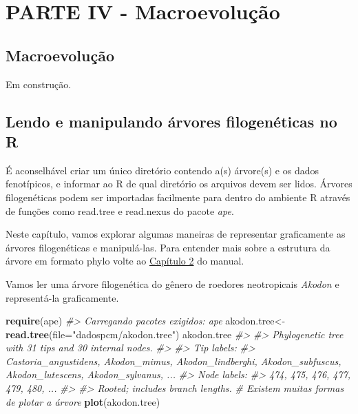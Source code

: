 \documentclass[
]{book}
\newenvironment{Shaded}{\begin{snugshade}}{\end{snugshade}}
\newcommand{\AttributeTok}[1]{\textcolor[rgb]{0.13,0.29,0.53}{#1}}
\newcommand{\CommentTok}[1]{\textcolor[rgb]{0.56,0.35,0.01}{\textit{#1}}}
\newcommand{\FunctionTok}[1]{\textcolor[rgb]{0.13,0.29,0.53}{\textbf{#1}}}
\newcommand{\NormalTok}[1]{#1}
\newcommand{\OtherTok}[1]{\textcolor[rgb]{0.56,0.35,0.01}{#1}}
\newcommand{\StringTok}[1]{\textcolor[rgb]{0.31,0.60,0.02}{#1}}
\begin{document}
\part{PARTE IV - Macroevolução}\label{part-parte-iv---macroevoluuxe7uxe3o}

\chapter{Macroevolução}\label{macroevoluuxe7uxe3o}

Em construção.

\chapter{Lendo e manipulando árvores filogenéticas no R}\label{lendo-e-manipulando-uxe1rvores-filogenuxe9ticas-no-r}

É aconselhável criar um único diretório contendo a(s) árvore(s) e os dados fenotípicos, e informar ao R de qual diretório os arquivos devem ser lidos. Árvores filogenéticas podem ser importadas facilmente para dentro do ambiente R através de funções como read.tree e read.nexus do pacote \emph{ape}.

Neste capítulo, vamos explorar algumas maneiras de representar graficamente as árvores filogenéticas e manipulá-las. Para entender mais sobre a estrutura da árvore em formato phylo volte ao \hyperref[cap2]{Capítulo 2} do manual.

Vamos ler uma árvore filogenética do gênero de roedores neotropicais \emph{Akodon} e representá-la graficamente.

\begin{Shaded}
\begin{Highlighting}[]
\FunctionTok{require}\NormalTok{(ape)}
\CommentTok{\#\textgreater{} Carregando pacotes exigidos: ape}
\NormalTok{akodon.tree}\OtherTok{\textless{}{-}}\FunctionTok{read.tree}\NormalTok{(}\AttributeTok{file=}\StringTok{"dadospcm/akodon.tree"}\NormalTok{)}
\NormalTok{akodon.tree}
\CommentTok{\#\textgreater{} }
\CommentTok{\#\textgreater{} Phylogenetic tree with 31 tips and 30 internal nodes.}
\CommentTok{\#\textgreater{} }
\CommentTok{\#\textgreater{} Tip labels:}
\CommentTok{\#\textgreater{}   Castoria\_angustidens, Akodon\_mimus, Akodon\_lindberghi, Akodon\_subfuscus, Akodon\_lutescens, Akodon\_sylvanus, ...}
\CommentTok{\#\textgreater{} Node labels:}
\CommentTok{\#\textgreater{}   474, 475, 476, 477, 479, 480, ...}
\CommentTok{\#\textgreater{} }
\CommentTok{\#\textgreater{} Rooted; includes branch lengths.}
\CommentTok{\# Existem muitas formas de plotar a árvore}
\FunctionTok{plot}\NormalTok{(akodon.tree)}
\end{Highlighting}
\end{Shaded}
\end{document}
